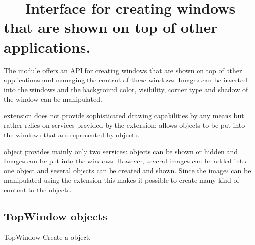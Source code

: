 %
%
%

\section{ ---
         Interface for creating windows that are shown on top of other 
         applications.}
\label{sec:topwindow}

         
The  module offers an API for creating windows that are shown 
on top of other applications and managing the content of these windows. 
Images can be inserted into the windows and the background color, visibility, 
corner type and shadow of the window can be manipulated.

 extension does not provide sophisticated drawing capabilities 
by any means but rather relies on services provided by the  
extension:  allows   objects to 
be put into the windows that are represented by  objects.

 object provides mainly only two services:  
objects can be shown or hidden and Images can be put into the windows. However, 
several images can be added into one  object and several 
 objects can be created and shown. Since the images can be 
manipulated using the  extension this makes it possible to 
create many kind of content to the  objects.

\subsection{TopWindow objects}

\begin{classdesc}{TopWindow}{}
Create a  object.
\end{classdesc}

